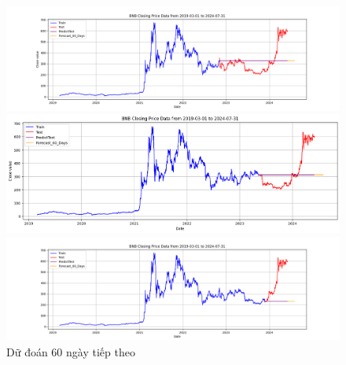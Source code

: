 \documentclass[conference]{IEEEtran}
\begin{document}
\begin{figure}[H]
    \centering
    \begin{minipage}{0.15\textwidth}
    \centering
    \includegraphics[width=1\textwidth]{Figure/ARIMA_BNB_60days_73.png}
    \end{minipage}
    \hfill
    \begin{minipage}{0.15\textwidth}
    \centering
    \includegraphics[width=1\textwidth]{Figure/ARIMA_BNB_60days_82.png}
    \end{minipage}
    \hfill
    \begin{minipage}{0.15\textwidth}
    \centering
    \includegraphics[width=1\textwidth]{Figure/ARIMA_BNB_60days_91.png}
    \end{minipage}
    \caption{Dữ đoán 60 ngày tiếp theo}
    \label{fig:1}
\end{figure}
\end{document}
